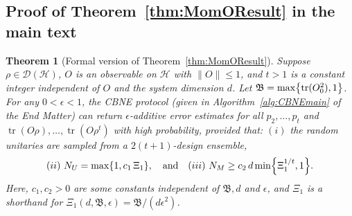 \documentclass[aps,prl,twocolumn,nofootinbib,superscriptaddress,10pt]{revtex4-2}
\let\originalleft\left
\let\originalright\right
\renewcommand{\left}{\mathopen{}\mathclose\bgroup\originalleft}
\renewcommand{\right}{\aftergroup\egroup\originalright}
\DeclareMathOperator{\Tr}{tr}
\theoremstyle{plain}
\newtheorem{theorem}[thm]{Theorem}
\theoremstyle{definition}
\newcommand{\caH}{\mathcal{H}}
\newcommand{\caD}{\mathcal{D}}
\newcommand{\tref}[1]{Theorem~\ref{#1}}
\begin{document}
\subsection{Proof of \tref{thm:MomOResult} in the main text}\label{sec:CBNEmoment}


\begin{theorem}[Formal version of \tref{thm:MomOResult}]
\label{thm:MomOResultRestate}%
Suppose $\rho\in\caD(\caH)$, $O$ is an observable on $\caH$ with $\|O\|\le 1$, and $t>1$ is a constant integer independent of $O$ and the system dimension $d$.
Let $\mathfrak{B}= \max \left\lbrace \Tr(O_0^2),1\right\rbrace$. 
For any $0<\epsilon<1$, the CBNE protocol (given in  Algorithm~\ref{alg:CBNEmain} of the End Matter) can return $\epsilon$-additive error estimates for all $p_2,\dots,p_t$  and $\Tr(O\rho),\dots,\Tr(O\rho^t)$ with high probability, provided that: $(i)$ the random unitaries are sampled from a $2(t+1)$-design ensemble, 
\begin{align} 
(ii)\ N_U=\max\left\lbrace 1, c_1 \,\Xi_1 \right\rbrace, 
\quad\text{and}\quad
(iii)\ N_M\geq c_2\,d \min\left\lbrace \Xi_1^{1/t}, 1 \right\rbrace. 
\end{align}
Here, $c_1,c_2>0$ are some constants independent of $\mathfrak{B},d$ and $\epsilon$, and $\Xi_1$ is a shorthand for $\Xi_1(d,\mathfrak{B},\epsilon)=\mathfrak{B}/(d\epsilon^2)$.
\end{theorem}
\end{document}
